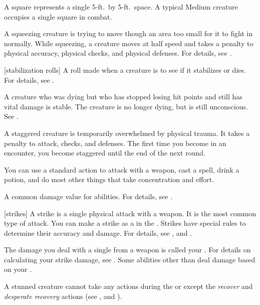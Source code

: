  A square represents a single 5-ft.\ by 5-ft.\ space.
A typical Medium creature occupies a single square in combat.

 A squeezing creature is trying to move though an area too small for it to fight in normally.
While squeezing, a creature moves at half speed and takes a  penalty to physical accuracy, physical checks, and physical defenses.
For details, see .

[stabilization rolls] A roll made when a creature is  to see if it stabilizes or dies. For details, see .

 A creature who was dying but who has stopped losing hit points and still has vital damage is stable. The creature is no longer dying, but is still unconscious. See .

 A staggered creature is temporarily overwhelmed by physical trauma.
It takes a  penalty to attack, checks, and defenses.
The first time you become  in an encounter, you become staggered until the end of the next round.

 You can use a standard action to attack with a weapon, cast a spell, drink a potion, and do most other things that take concentration and effort.

 A common damage value for abilities.
For details, see .

[strikes] A strike is a single physical attack with a weapon.
It is the most common type of attack.
You can make a strike as a  in the .
Strikes have special rules to determine their accuracy and damage.
For details, see , and .

 The damage you deal with a single  from a weapon is called your .
For details on calculating your strike damage, see .
Some abilities other than  deal damage based on your .

 A stunned creature cannot take any actions during the  or  except the \textit{recover} and \textit{desperate recovery} actions (see , and ).

